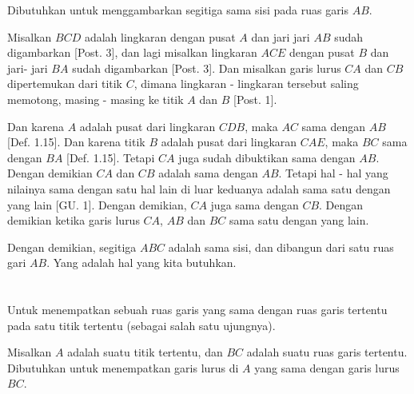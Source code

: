\documentclass[a4paper, 12pt]{book}
\begin{document}
Dibutuhkan untuk menggambarkan segitiga sama sisi pada ruas garis $AB$.

Misalkan $BCD$ adalah lingkaran dengan pusat $A$ dan jari jari $AB$ sudah 
digambarkan [Post. 3], dan lagi misalkan lingkaran $ACE$ dengan pusat $B$ 
dan jari- jari $BA$ sudah digambarkan [Post. 3]. Dan misalkan garis lurus 
$CA$ dan $CB$ dipertemukan dari titik $C$, dimana lingkaran - lingkaran 
tersebut saling memotong, masing - masing ke titik $A$ dan $B$ [Post. 1].  


Dan karena $A$ adalah pusat dari lingkaran $CDB$, maka $AC$ sama dengan $AB$
[Def. 1.15]. Dan karena titik $B$ adalah pusat dari lingkaran $CAE$, maka
$BC$ sama dengan $BA$ [Def. 1.15]. Tetapi $CA$ juga sudah dibuktikan sama 
dengan $AB$. Dengan demikian $CA$ dan $CB$ adalah sama dengan $AB$. Tetapi
hal - hal yang nilainya sama dengan satu hal lain di luar keduanya adalah sama
satu dengan yang lain [GU. 1]. Dengan demikian, $CA$ juga sama dengan $CB$.  
Dengan demikian ketika garis lurus $CA$, $AB$ dan $BC$ sama satu dengan 
yang lain.

Dengan demikian, segitiga $ABC$ adalah sama sisi, dan dibangun dari
satu ruas gari $AB$. Yang adalah hal yang kita butuhkan.  

\section*{\centering \thesection} 

Untuk menempatkan sebuah ruas garis yang sama dengan ruas garis tertentu
pada satu titik tertentu (sebagai salah satu ujungnya).


Misalkan $A$ adalah suatu titik tertentu, dan $BC$ adalah suatu ruas garis
tertentu. Dibutuhkan untuk menempatkan garis lurus di $A$ yang sama dengan
garis lurus $BC$.
\end{document}
